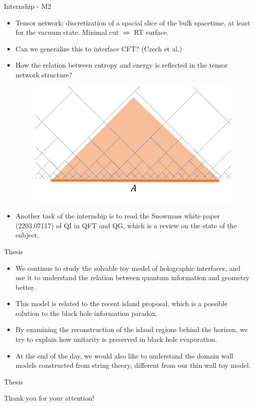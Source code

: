 \documentclass{beamer}
\begin{document}
\begin{frame}{Internship - M2}
\begin{itemize}

\item Tensor network: discretization of a spacial slice of the bulk spacetime, at least for the vacuum state.
Minimal cut $\iff$ RT surface.

\item Can we generalize this to interface CFT?
(Czech et al.)

\item How the relation between entropy and energy is reflected in the tensor network structure?

\begin{figure}[htb]
    \centering
    \includegraphics[scale=0.4]{Figures/mera network.png}
\end{figure}

\item Another task of the internship is to read the Snowmass white paper (2203.07117) of QI in QFT and QG, which is a review on the state of the subject.

\end{itemize}
\end{frame}

\begin{frame}{Thesis}
\begin{itemize}

\item We continue to study the solvable toy model of holographic interfaces, and use it to understand the relation between quantum information and geometry better.

\item This model is related to the recent island proposal, which is a possible solution to the black hole information paradox.

\item By examining the reconstruction of the island regions behind the horizon, we try to explain how unitarity is preserved in black hole evaporation.

\item At the end of the day, we would also like to understand the domain wall models constructed from string theory, different from our thin wall toy model.

\end{itemize}
\end{frame}


\begin{frame}{Thesis}
\begin{itemize}

Thank you for your attention!

\end{itemize}
\end{frame}
\end{document}
